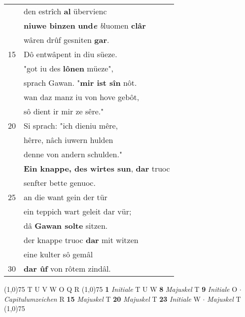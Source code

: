 \documentclass[8pt,a4paper,notitlepage]{article}
\begin{document}
\begin{table}[ht]
\begin{minipage}[t]{0.5\linewidth}
\begin{tabular}{rl}
 & den estrîch \textbf{al} übervienc\\ 
 & \textbf{niuwe binzen} \textbf{und\textit{e}} \textit{b}luomen \textbf{clâr}\\ 
 & wâren drûf gesniten \textbf{gar}.\\ 
15 & Dô entwâpent in diu süeze.\\ 
 & "got iu des \textbf{lônen} müeze",\\ 
 & sprach Gawan. "\textbf{mir ist sîn} nôt.\\ 
 & wan daz manz iu von hove gebôt,\\ 
 & sô dient ir mir ze sêre."\\ 
20 & Si sprach: "ich dieniu mêre,\\ 
 & hêrre, nâch iuwern hulden\\ 
 & denne von andern schulden."\\ 
 & \textbf{Ein knappe, des wirtes sun}, \textbf{dar} truoc\\ 
 & senfter bette genuoc.\\ 
25 & an die want gein der tür\\ 
 & ein teppich wart geleit dar vür;\\ 
 & dâ \textbf{Gawan solte} sitzen.\\ 
 & der knappe truoc \textbf{dar} mit witzen\\ 
 & eine kulter sô gemâl\\ 
30 & \textbf{dar ûf} von rôtem zindâl.\\ 
\end{tabular}
\scriptsize
\line(1,0){75} \newline
T U V W O Q R \newline
\line(1,0){75} \newline
\textbf{1} \textit{Initiale} T U W  \textbf{8} \textit{Majuskel} T  \textbf{9} \textit{Initiale} O   $\cdot$ \textit{Capitulumzeichen} R  \textbf{15} \textit{Majuskel} T  \textbf{20} \textit{Majuskel} T  \textbf{23} \textit{Initiale} W   $\cdot$ \textit{Majuskel} T  \newline
\line(1,0){75} \newline

\end{minipage}
\end{table}
\end{document}
